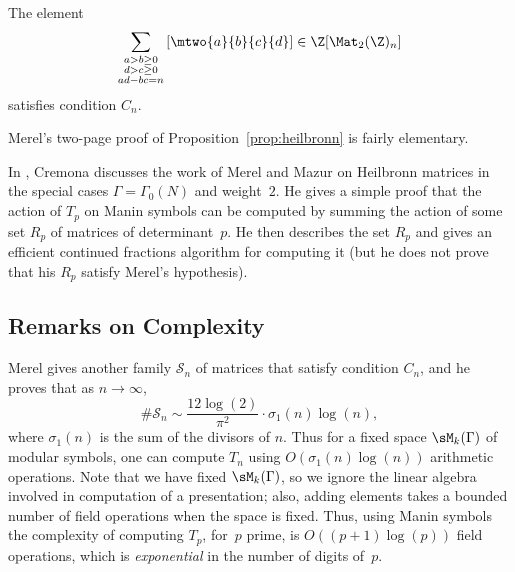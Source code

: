 \begin{proposition}[Merel]\label{prop:heilbronn}
The element
$$\sum_{\substack{a>b\geq 0\\d>c\geq 0\\ad-bc=n}}
\left[\mtwo{a}{b}{c}{d}\right] \in \Z[\Mat_2(\Z)_n]
$$
satisfies condition $C_n$.
\end{proposition}
Merel's two-page proof of Proposition~\ref{prop:heilbronn}
is fairly elementary. 

\begin{remark}
  In \cite[\S2.4]{cremona:algs}, Cremona discusses the work of Merel
  and Mazur on Heilbronn matrices in the special cases
  $\Gamma=\Gamma_0(N)$ and weight~$2$.  He gives a simple proof
  that the action of $T_p$ on Manin symbols can be computed by summing
  the action of some set $R_p$ of matrices of determinant~$p$.  He
  then describes the set $R_p$ and gives an efficient continued
  fractions algorithm for computing it (but he does not prove
  that his $R_p$ satisfy Merel's hypothesis). 
\end{remark}

\subsection{Remarks on Complexity}
Merel gives another family $\mathcal{S}_n$ of matrices
that satisfy condition $C_n$, and he proves that
as $n\to \infty$,
$$\#\mathcal{S}_n \sim \frac{12 \log(2)}{\pi^2} \cdot 
  \sigma_1(n)\log(n),$$
where $\sigma_1(n)$ is the sum of the divisors of $n$.
Thus for a fixed space $\sM_k(\Gamma)$ of modular symbols,
one can compute $T_n$ using
$O(\sigma_1(n)\log(n))$ arithmetic operations.  
Note that we have fixed $\sM_k(\Gamma)$, so we ignore 
the linear algebra involved in computation of a presentation; also, adding
elements takes a bounded number of field operations when the space
is fixed.  Thus, using Manin symbols 
the complexity of computing $T_p$, for~$p$ prime, is $O((p+1)\log(p))$
field operations, which is {\em exponential} in the number of digits
of~$p$.     

